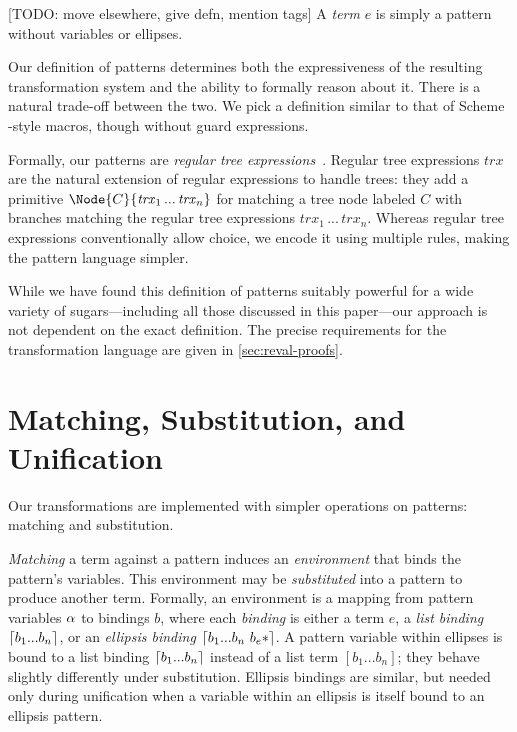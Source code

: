 [TODO: move elsewhere, give defn, mention tags]
A \emph{term} $e$ is simply a pattern without variables or
ellipses.

Our definition of patterns determines both the expressiveness of the
resulting transformation system and the ability to formally reason about
it. There is a natural trade-off between the two. We pick a definition similar to
that of Scheme -style macros, though without guard
expressions.

Formally, our patterns are \emph{regular tree
  expressions}~\cite{regular-tree-expressions}. Regular tree
expressions $\mathit{trx}$ are the natural extension of regular
expressions to handle trees: they add a primitive $\Node{C}{\mathit{trx}_1
\,...\,\mathit{trx}_n}$ for matching a tree node labeled $C$ with
branches matching the regular tree expressions
$\mathit{trx}_1\,...\,\mathit{trx}_n$. Whereas regular tree
expressions conventionally allow choice, we encode it using multiple
rules, making the pattern language simpler.

While we have found this definition of patterns suitably powerful for a
wide variety of sugars---including all those discussed in this paper---our
approach is not dependent on the exact definition. The precise
requirements for the transformation language are given in
\cref{sec:reval-proofs}.



\section{Matching, Substitution, and Unification}

Our transformations are implemented with simpler operations on patterns:
matching and substitution.

\emph{Matching} a term against a pattern induces an \emph{environment}
that binds the pattern's variables. This environment may be
\emph{substituted} into a pattern to produce another term. Formally, an
environment is a mapping from pattern variables $\alpha$ to bindings $b$,
where each \emph{binding} is either a term $e$, a \emph{list binding}
$\lceil b_1...b_n \rceil$, or an \emph{ellipsis binding}
$\BList{b_1...b_n\ \Ell{b_e}}$. A pattern variable within ellipses is
bound to a list binding $\lceil b_1...b_n \rceil$ instead of a list term
$[b_1...b_n]$; they behave slightly differently under
substitution. Ellipsis bindings are similar, but needed only during
unification when a variable within an ellipsis is itself bound to an
ellipsis pattern.


